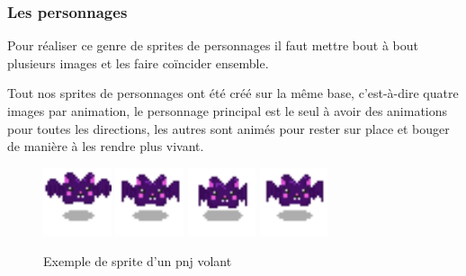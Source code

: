 \documentclass{article}
\begin{document}
\subsubsection{Les personnages}


Pour réaliser ce genre de sprites de personnages il faut mettre bout à bout plusieurs images et les faire coïncider ensemble.

Tout nos sprites de personnages ont été créé sur la même base, c'est-à-dire quatre images par animation, le personnage principal est le seul à avoir des animations pour toutes les directions, les autres sont animés pour rester sur place et bouger de manière à les rendre plus vivant.
\begin{figure}[h]
    \centering
    \includegraphics[height = 2cm]{py/idle_0.png}
    \includegraphics[height = 2cm]{py/idle_1.png}
    \includegraphics[height = 2cm]{py/idle_2.png}
    \includegraphics[height = 2cm]{py/idle_3.png}
    \caption{Exemple de sprite d'un pnj volant}
\end{figure}
\end{document}
